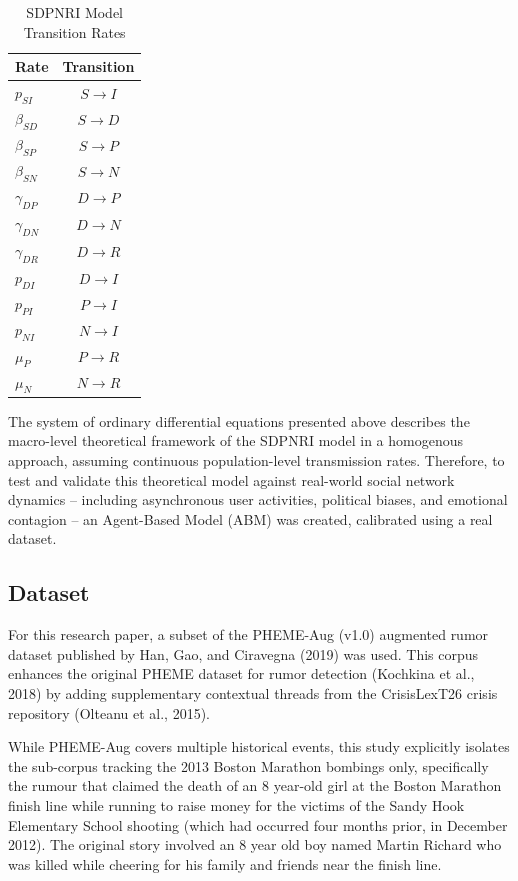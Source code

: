 \documentclass[11pt]{article}
\begin{document}
\begin{table}[htbp]
\centering
\caption{SDPNRI Model Transition Rates}
\label{tab:transition_rates}
\begin{tabular}{lc}
\toprule
\textbf{Rate} & \textbf{Transition} \\
\midrule
$p_{SI}$      & $S \rightarrow I$ \\
$\beta_{SD}$  & $S \rightarrow D$ \\
$\beta_{SP}$  & $S \rightarrow P$ \\
$\beta_{SN}$  & $S \rightarrow N$ \\
$\gamma_{DP}$ & $D \rightarrow P$ \\
$\gamma_{DN}$ & $D \rightarrow N$ \\
$\gamma_{DR}$ & $D \rightarrow R$ \\
$p_{DI}$      & $D \rightarrow I$ \\
$p_{PI}$      & $P \rightarrow I$ \\
$p_{NI}$      & $N \rightarrow I$ \\
$\mu_P$       & $P \rightarrow R$ \\
$\mu_N$       & $N \rightarrow R$ \\
\bottomrule
\end{tabular}
\end{table}

The system of ordinary differential equations presented above describes the
macro-level theoretical framework of the SDPNRI model in a homogenous approach,
assuming continuous population-level transmission rates. Therefore, to test and
validate this theoretical model against real-world social network dynamics --
including asynchronous user activities, political biases, and emotional contagion --
an Agent-Based Model (ABM) was created, calibrated using a real dataset.

\subsection{Dataset}

For this research paper, a subset of the PHEME-Aug (v1.0) augmented rumor dataset
published by Han, Gao, and Ciravegna (2019) was used. This corpus enhances the
original PHEME dataset for rumor detection (Kochkina et al., 2018) by adding
supplementary contextual threads from the CrisisLexT26 crisis repository (Olteanu et
al., 2015).

While PHEME-Aug covers multiple historical events, this study explicitly isolates the
sub-corpus tracking the 2013 Boston Marathon bombings only, specifically the rumour
that claimed the death of an 8 year-old girl at the Boston Marathon finish line while
running to raise money for the victims of the Sandy Hook Elementary School shooting
(which had occurred four months prior, in December 2012). The original story involved
an 8 year old boy named Martin Richard who was killed while cheering for his family
and friends near the finish line.
\end{document}
